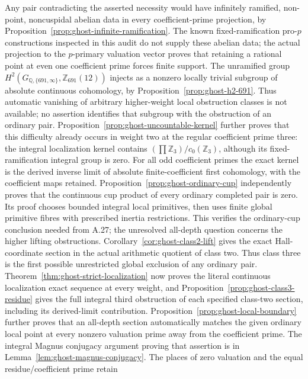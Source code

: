 Any pair contradicting the asserted necessity would have
infinitely ramified, non-point, noncuspidal abelian data in
every coefficient-prime projection, by
Proposition~\ref{prop:ghost-infinite-ramification}. The
known fixed-ramification pro-\(p\) constructions inspected in
this audit do not supply these abelian data; the actual
projection to the \(p\)-primary valuation vector proves
that retaining a rational point at even one coefficient prime
forces finite support. The unramified group
\(H^2(G_{\mathbb Q,\{691,\infty\}},\mathbb Z_{691}(12))\)
injects as a nonzero locally trivial subgroup of absolute
continuous cohomology, by
Proposition~\ref{prop:ghost-h2-691}. Thus automatic vanishing
of arbitrary higher-weight local obstruction classes is not
available; no assertion identifies that subgroup with the
obstruction of an ordinary pair.
Proposition~\ref{prop:ghost-uncountable-kernel} further proves
that this difficulty already occurs in weight two at the
regular coefficient prime three: the integral localization
kernel contains \((\prod\mathbb Z_3)/c_0(\mathbb Z_3)\),
although its fixed-ramification integral group is zero.
For all odd coefficient primes the exact kernel is the
derived inverse limit of absolute finite-coefficient
first cohomology, with the coefficient maps retained.
Proposition~\ref{prop:ghost-ordinary-cup} independently
proves that the continuous cup product of every ordinary
completed pair is zero. Its proof chooses bounded integral
local primitives, then uses finite global primitive fibres
with prescribed inertia restrictions. This verifies the
ordinary-cup conclusion needed from A.27; the unresolved
all-depth question concerns the higher lifting obstructions.
Corollary~\ref{cor:ghost-class2-lift} gives the exact Hall-coordinate
section in the actual arithmetic quotient of class two. Thus
class three is the first possible unrestricted global exclusion
of any ordinary pair. Theorem~\ref{thm:ghost-strict-localization}
now proves the literal continuous localization exact sequence
at every weight, and Proposition~\ref{prop:ghost-class3-residue}
gives the full integral third obstruction of each specified
class-two section, including its derived-limit contribution.
Proposition~\ref{prop:ghost-local-boundary} further proves
that an all-depth section automatically matches the given
ordinary local point at every nonzero valuation prime away
from the coefficient prime. The integral Magnus conjugacy
argument proving that assertion is in
Lemma~\ref{lem:ghost-magnus-conjugacy}. The places of zero
valuation and the equal residue/coefficient prime retain

